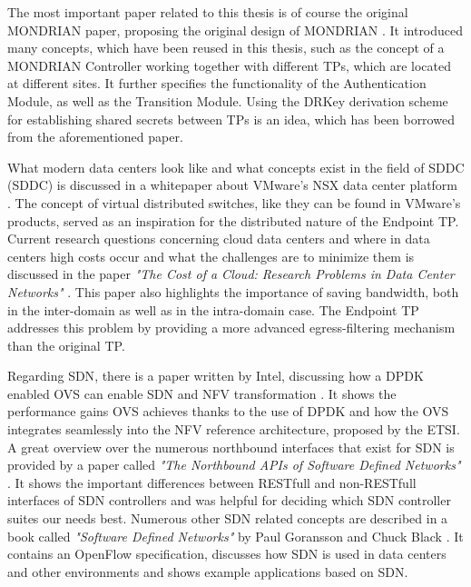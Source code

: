 
The most important paper related to this thesis is of course the original MONDRIAN paper, proposing the original design of MONDRIAN \cite{kwonmondrian}. It introduced many concepts, which have been reused in this thesis, such as the concept of a MONDRIAN Controller working together with different \acsp{TP}, which are located at different sites. It further specifies the functionality of the Authentication Module, as well as the Transition Module. Using the \acs{DRKey} derivation scheme for establishing shared secrets between \acsp{TP} is an idea, which has been borrowed from the aforementioned paper. 

What modern data centers look like and what concepts exist in the field of \acs{SDDC} (\acl{SDDC}) is discussed in a whitepaper about VMware\texttrademark's NSX data center platform \cite{vmware2021nsx}. The concept of virtual distributed switches, like they can be found in VMware's products, served as an inspiration for the distributed nature of the Endpoint \acs{TP}. Current research questions concerning cloud data centers and where in data centers high costs occur and what the challenges are to minimize them is discussed in the paper \textit{"The Cost of a Cloud: Research Problems in Data Center Networks"} \cite{greenberg2008cost}. This paper also highlights the importance of saving bandwidth, both in the inter-domain as well as in the intra-domain case. The Endpoint \acs{TP} addresses this problem by providing a more advanced egress-filtering mechanism than the original \acs{TP}.

Regarding \acs{SDN}, there is a paper written by Intel\texttrademark,  discussing how a \acs{DPDK} enabled \acs{OVS} can enable \acs{SDN} and \acs{NFV} transformation \cite{intel2015OVS}. It shows the performance gains \acs{OVS} achieves thanks to the use of \acs{DPDK} and how the \acs{OVS} integrates seamlessly into the \acs{NFV} reference architecture, proposed by the \acs{ETSI}. A great overview over the numerous northbound interfaces that exist for \acs{SDN} is provided by a paper called \textit{"The Northbound APIs of Software Defined Networks"} \cite{tijare2016northbound}. It shows the important differences between \acs{REST}full and non-\acs{REST}full interfaces of \acs{SDN} controllers and was helpful for deciding which \acs{SDN} controller suites our needs best. Numerous other \acs{SDN} related concepts are described in a book called \textit{"Software Defined Networks"} by Paul Goransson and Chuck Black \cite{goransson2014SDN}. It contains an OpenFlow specification, discusses how \acs{SDN} is used in data centers and other environments and shows example applications based on \acs{SDN}.

